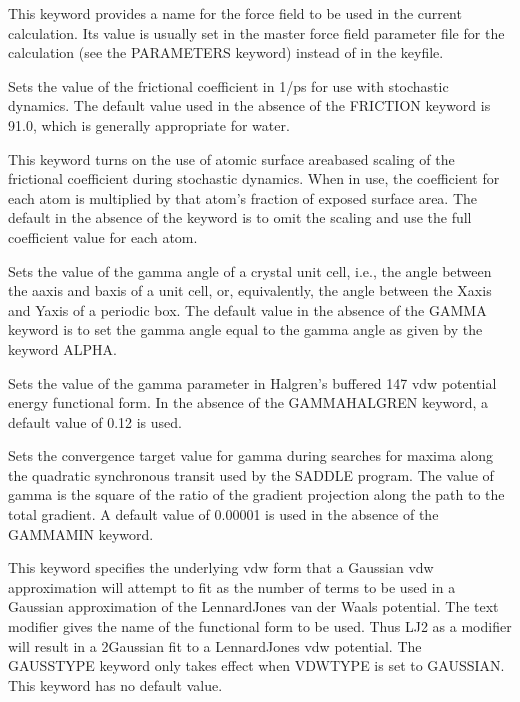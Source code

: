 \documentclass[letterpaper,11pt,english]{sphinxmanual}
\begin{document}



  This keyword provides a name for the force field to be used in the current calculation. Its value is usually set in the master force field parameter file for the calculation (see the PARAMETERS keyword) instead of in the keyfile.

  Sets the value of the frictional coefficient in 1/ps for use with stochastic dynamics. The default value used in the absence of the FRICTION keyword is 91.0, which is generally appropriate for water.

  This keyword turns on the use of atomic surface area\sphinxhyphen{}based scaling of the frictional coefficient during stochastic dynamics. When in use, the coefficient for each atom is multiplied by that atom’s fraction of exposed surface area. The default in the absence of the keyword is to omit the scaling and use the full coefficient value for each atom.

  Sets the value of the gamma angle of a crystal unit cell, i.e., the angle between the a\sphinxhyphen{}axis and b\sphinxhyphen{}axis of a unit cell, or, equivalently, the angle between the X\sphinxhyphen{}axis and Y\sphinxhyphen{}axis of a periodic box. The default value in the absence of the GAMMA keyword is to set the gamma angle equal to the gamma angle as given by the keyword ALPHA.

  Sets the value of the gamma parameter in Halgren’s buffered 14\sphinxhyphen{}7 vdw potential energy functional form. In the absence of the GAMMA\sphinxhyphen{}HALGREN keyword, a default value of 0.12 is used.

  Sets the convergence target value for gamma during searches for maxima along the quadratic synchronous transit used by the SADDLE program. The value of gamma is the square of the ratio of the gradient projection along the path to the total gradient. A default value of 0.00001 is used in the absence of the GAMMAMIN keyword.

  This keyword specifies the underlying vdw form that a Gaussian vdw approximation will attempt to fit as the number of terms to be used in a Gaussian approximation of the Lennard\sphinxhyphen{}Jones van der Waals potential. The text modifier gives the name of the functional form to be used. Thus LJ\sphinxhyphen{}2 as a modifier will result in a 2\sphinxhyphen{}Gaussian fit to a Lennard\sphinxhyphen{}Jones vdw potential. The GAUSSTYPE keyword only takes effect when VDWTYPE is set to GAUSSIAN. This keyword has no default value.
\end{document}
